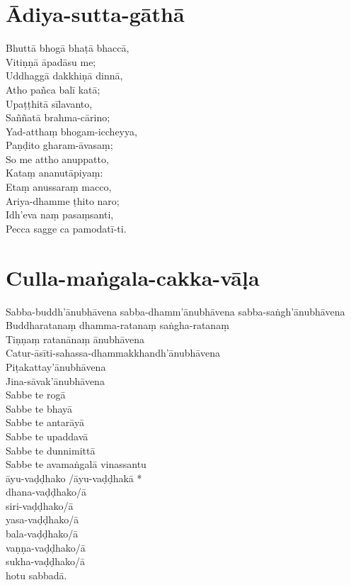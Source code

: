 \chapter{Ādiya-sutta-gāthā}

Bhuttā bhogā bhaṭā bhaccā,\\
Vitiṇṇā āpadāsu me;\\
Uddhaggā dakkhiṇā dinnā,\\
Atho pañca balī katā;\\
Upaṭṭhitā sīlavanto,\\
Saññatā brahma-cārino;\\
Yad-atthaṃ bhogam-iccheyya,\\
Paṇḍito gharam-āvasaṃ;\\
So me attho anuppatto,\\
Kataṃ ananutāpiyaṃ:\\
Etaṃ anussaraṃ macco,\\
Ariya-dhamme ṭhito naro;\\
Idh’eva naṃ pasaṃsanti,\\
Pecca sagge ca pamodatī-ti.

\chapter{Culla-maṅgala-cakka-vāḷa}

Sabba-buddh’ānubhāvena sabba-dhamm’ānubhāvena sabba-saṅgh’ānubhāvena Buddharatanaṃ dhamma-ratanaṃ saṅgha-ratanaṃ\\
Tiṇṇaṃ ratanānaṃ ānubhāvena\\
Catur-āsīti-sahassa-dhammakkhandh’ānubhāvena\\
Piṭakattay’ānubhāvena\\
Jina-sāvak’ānubhāvena\\
Sabbe te rogā\\
Sabbe te bhayā\\
Sabbe te antarāyā\\
Sabbe te upaddavā\\
Sabbe te dunnimittā\\
Sabbe te avamaṅgalā vinassantu\\
āyu-vaḍḍhako /āyu-vaḍḍhakā *\\
dhana-vaḍḍhako/ā\\
siri-vaḍḍhako/ā\\
yasa-vaḍḍhako/ā\\
bala-vaḍḍhako/ā\\
vaṇṇa-vaḍḍhako/ā\\
sukha-vaḍḍhako/ā\\
hotu sabbadā.

